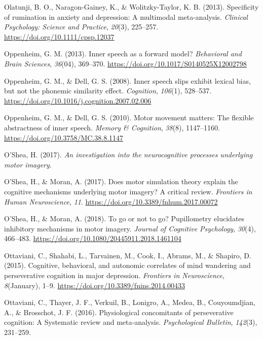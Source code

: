 \documentclass[a4paper,12pt,twoside,onecolumn,openright,final,oldfontcommands]{memoir}
\begin{document}
\leavevmode\hypertarget{ref-olatunji_specificity_2013}{}%
Olatunji, B. O., Naragon-Gainey, K., \& Wolitzky-Taylor, K. B. (2013). Specificity of rumination in anxiety and depression: A multimodal meta-analysis. \emph{Clinical Psychology: Science and Practice}, \emph{20}(3), 225--257. \url{https://doi.org/10.1111/cpsp.12037}

\leavevmode\hypertarget{ref-oppenheim_inner_2013}{}%
Oppenheim, G. M. (2013). Inner speech as a forward model? \emph{Behavioral and Brain Sciences}, \emph{36}(04), 369--370. \url{https://doi.org/10.1017/S0140525X12002798}

\leavevmode\hypertarget{ref-oppenheim_inner_2008}{}%
Oppenheim, G. M., \& Dell, G. S. (2008). Inner speech slips exhibit lexical bias, but not the phonemic similarity effect. \emph{Cognition}, \emph{106}(1), 528--537. \url{https://doi.org/10.1016/j.cognition.2007.02.006}

\leavevmode\hypertarget{ref-oppenheim_motor_2010}{}%
Oppenheim, G. M., \& Dell, G. S. (2010). Motor movement matters: The flexible abstractness of inner speech. \emph{Memory \& Cognition}, \emph{38}(8), 1147--1160. \url{https://doi.org/10.3758/MC.38.8.1147}

\leavevmode\hypertarget{ref-oshea_investigation_2017}{}%
O'Shea, H. (2017). \emph{An investigation into the neurocognitive processes underlying motor imagery}.

\leavevmode\hypertarget{ref-oshea_does_2017}{}%
O'Shea, H., \& Moran, A. (2017). Does motor simulation theory explain the cognitive mechanisms underlying motor imagery? A critical review. \emph{Frontiers in Human Neuroscience}, \emph{11}. \url{https://doi.org/10.3389/fnhum.2017.00072}

\leavevmode\hypertarget{ref-oshea_go_2018}{}%
O'Shea, H., \& Moran, A. (2018). To go or not to go? Pupillometry elucidates inhibitory mechanisms in motor imagery. \emph{Journal of Cognitive Psychology}, \emph{30}(4), 466--483. \url{https://doi.org/10.1080/20445911.2018.1461104}

\leavevmode\hypertarget{ref-Ottaviani2015}{}%
Ottaviani, C., Shahabi, L., Tarvainen, M., Cook, I., Abrams, M., \& Shapiro, D. (2015). Cognitive, behavioral, and autonomic correlates of mind wandering and perseverative cognition in major depression. \emph{Frontiers in Neuroscience}, \emph{8}(January), 1--9. \url{https://doi.org/10.3389/fnins.2014.00433}

\leavevmode\hypertarget{ref-ottaviani_physiological_2016}{}%
Ottaviani, C., Thayer, J. F., Verkuil, B., Lonigro, A., Medea, B., Couyoumdjian, A., \& Brosschot, J. F. (2016). Physiological concomitants of perseverative cognition: A Systematic review and meta-analysis. \emph{Psychological Bulletin}, \emph{142}(3), 231--259.
\end{document}

